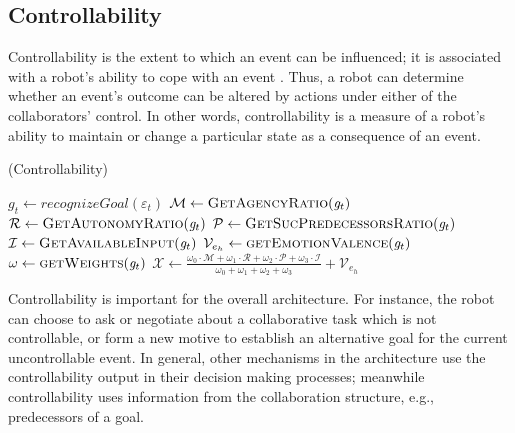 \documentclass{article}
\begin{document}
\subsection{Controllability}
\label{sec:controllability}

Controllability is the extent to which an event can be influenced; it is
associated with a robot's ability to cope with an event
\cite{gratch:domain-independent}. Thus, a robot can determine whether an event's
outcome can be altered by actions under either of the collaborators' control. In
other words, controllability is a measure of a robot's ability to maintain or
change a particular state as a consequence of an event.

\begin{algorithm}
	\caption{(Controllability)}
	\label{alg:controllability}
	\begin{algorithmic}[1]
 			\State $\mathit{g}_{t} \gets \textit{recognizeGoal}{(\varepsilon_t)}$
 			\Statex
			\State $\mathcal{M} \gets \Call{GetAgencyRatio}{\mathit{g}_{t}}$ 
			\State $\mathcal{R} \gets \Call{GetAutonomyRatio}{\mathit{g}_{t}}$
			\State $\mathcal{P} \gets \Call{GetSucPredecessorsRatio}{\mathit{g}_{t}}$
			\State $\mathcal{I} \gets \Call{GetAvailableInput}{\mathit{g}_{t}}$
			\State $\mathcal{V}_{e_h} \gets \Call{getEmotionValence}{\mathit{g}_{t}}$ 
			\State $\omega \gets \Call{getWeights}{\mathit{g}_{t}}$
			\Statex
			\State $\mathcal{X} \gets
			\frac{\omega_{0}\cdot \mathcal{M} + \omega_{1}\cdot \mathcal{R} +
			\omega_{2}\cdot \mathcal{P} + \omega_{3}\cdot \mathcal{I}}{\omega_{0} +
			\omega_{1} + \omega_{2} + \omega_{3}} + \mathcal{V}_{e_h}$
  			\Statex
				\State {}
			\Else
				\State {}
			\EndIf
		\EndFunction
	\end{algorithmic}
\end{algorithm}

\vspace*{-3mm}
Controllability is important for the overall architecture. For instance, the
robot can choose to ask or negotiate about a collaborative task which is not
controllable, or form a new motive to establish an alternative goal for the
current uncontrollable event. In general, other mechanisms in the architecture
use the controllability output in their decision making processes; meanwhile
controllability uses information from the collaboration structure, e.g.,
predecessors of a goal.
\end{document}
